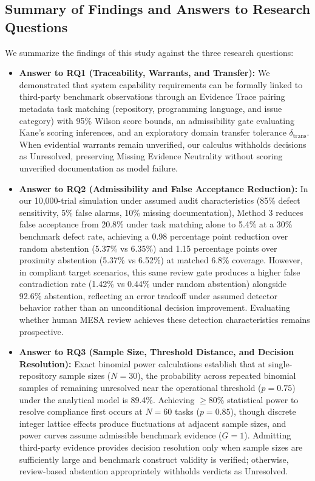 \documentclass[runningheads]{llncs}
\begin{document}
\subsection{Summary of Findings and Answers to Research Questions}
We summarize the findings of this study against the three research questions:
\begin{itemize}[leftmargin=*]
    \item \textbf{Answer to RQ1 (Traceability, Warrants, and Transfer):} We demonstrated that system capability requirements can be formally linked to third-party benchmark observations through an Evidence Trace pairing metadata task matching (repository, programming language, and issue category) with 95\% Wilson score bounds, an admissibility gate evaluating Kane's scoring inferences, and an exploratory domain transfer tolerance $\delta_{\text{trans}}$. When evidential warrants remain unverified, our calculus withholds decisions as Unresolved, preserving Missing Evidence Neutrality without scoring unverified documentation as model failure.
    \item \textbf{Answer to RQ2 (Admissibility and False Acceptance Reduction):} In our 10,000-trial simulation under assumed audit characteristics (85\% defect sensitivity, 5\% false alarms, 10\% missing documentation), Method 3 reduces false acceptance from 20.8\% under task matching alone to 5.4\% at a 30\% benchmark defect rate, achieving a 0.98 percentage point reduction over random abstention (5.37\% vs 6.35\%) and 1.15 percentage points over proximity abstention (5.37\% vs 6.52\%) at matched 6.8\% coverage. However, in compliant target scenarios, this same review gate produces a higher false contradiction rate (1.42\% vs 0.44\% under random abstention) alongside 92.6\% abstention, reflecting an error tradeoff under assumed detector behavior rather than an unconditional decision improvement. Evaluating whether human MESA review achieves these detection characteristics remains prospective.
    \item \textbf{Answer to RQ3 (Sample Size, Threshold Distance, and Decision Resolution):} Exact binomial power calculations establish that at single-repository sample sizes ($N = 30$), the probability across repeated binomial samples of remaining unresolved near the operational threshold ($p = 0.75$) under the analytical model is 89.4\%. Achieving $\ge 80\%$ statistical power to resolve compliance first occurs at $N = 60$ tasks ($p = 0.85$), though discrete integer lattice effects produce fluctuations at adjacent sample sizes, and power curves assume admissible benchmark evidence ($G=1$). Admitting third-party evidence provides decision resolution only when sample sizes are sufficiently large and benchmark construct validity is verified; otherwise, review-based abstention appropriately withholds verdicts as Unresolved.
\end{itemize}
\end{document}
